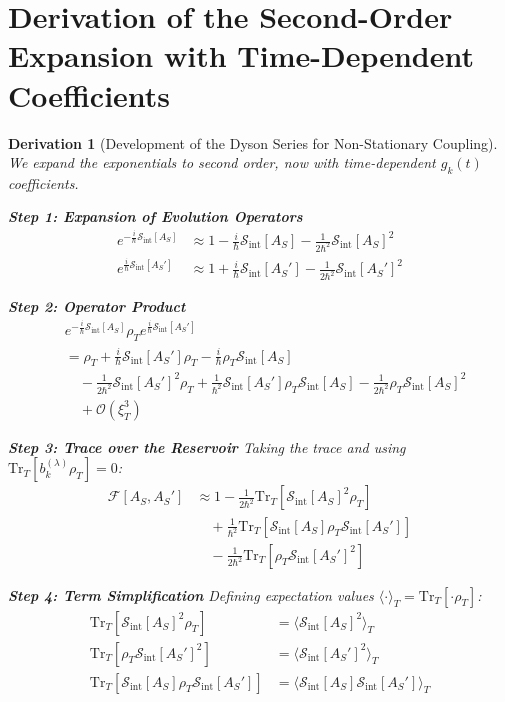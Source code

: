 \documentclass[10pt, a4paper]{article}
\newcommand{\Tr}{\text{Tr}}
\newcommand{\xiT}{\xi_T}       %
\newtheorem{derivation}{Derivation}
\begin{document}
\section{Derivation of the Second-Order Expansion with Time-Dependent Coefficients}

\begin{derivation}[Development of the Dyson Series for Non-Stationary Coupling]
We expand the exponentials to second order, now with time-dependent $g_k(t)$ coefficients.

\textbf{Step 1: Expansion of Evolution Operators}
\begin{align}
e^{-\frac{i}{\hbar} \mathcal{S}_{\text{int}}[A_S]} &\approx 1 - \frac{i}{\hbar} \mathcal{S}_{\text{int}}[A_S] - \frac{1}{2\hbar^2} \mathcal{S}_{\text{int}}[A_S]^2
\tag{12.1} \\
e^{\frac{i}{\hbar} \mathcal{S}_{\text{int}}[A_S']} &\approx 1 + \frac{i}{\hbar} \mathcal{S}_{\text{int}}[A_S'] - \frac{1}{2\hbar^2} \mathcal{S}_{\text{int}}[A_S']^2
\tag{12.2}
\end{align}

\textbf{Step 2: Operator Product}
\begin{align}
&e^{-\frac{i}{\hbar} \mathcal{S}_{\text{int}}[A_S]} \rho_T e^{\frac{i}{\hbar} \mathcal{S}_{\text{int}}[A_S']} \\
&= \rho_T + \frac{i}{\hbar} \mathcal{S}_{\text{int}}[A_S'] \rho_T - \frac{i}{\hbar} \rho_T \mathcal{S}_{\text{int}}[A_S] \\
&\quad - \frac{1}{2\hbar^2} \mathcal{S}_{\text{int}}[A_S']^2 \rho_T + \frac{1}{\hbar^2} \mathcal{S}_{\text{int}}[A_S'] \rho_T \mathcal{S}_{\text{int}}[A_S] - \frac{1}{2\hbar^2} \rho_T \mathcal{S}_{\text{int}}[A_S]^2 \\
&\quad + \mathcal{O}(\xiT^3)
\tag{12.3}
\end{align}

\textbf{Step 3: Trace over the Reservoir}
Taking the trace and using $\Tr_T[b_{k}^{(\lambda)} \rho_T] = 0$:
\begin{align}
\mathcal{F}[A_S, A_S'] &\approx 1 - \frac{1}{2\hbar^2} \Tr_T[\mathcal{S}_{\text{int}}[A_S]^2 \rho_T] \\
&\quad + \frac{1}{\hbar^2} \Tr_T[\mathcal{S}_{\text{int}}[A_S] \rho_T \mathcal{S}_{\text{int}}[A_S']] \\
&\quad - \frac{1}{2\hbar^2} \Tr_T[\rho_T \mathcal{S}_{\text{int}}[A_S']^2]
\tag{12.4}
\end{align}

\textbf{Step 4: Term Simplification}
Defining expectation values $\langle \cdot \rangle_T = \Tr_T[\cdot \rho_T]$:
\begin{align}
\Tr_T[\mathcal{S}_{\text{int}}[A_S]^2 \rho_T] &= \langle \mathcal{S}_{\text{int}}[A_S]^2 \rangle_T
\tag{12.5} \\
\Tr_T[\rho_T \mathcal{S}_{\text{int}}[A_S']^2] &= \langle \mathcal{S}_{\text{int}}[A_S']^2 \rangle_T
\tag{12.6} \\
\Tr_T[\mathcal{S}_{\text{int}}[A_S] \rho_T \mathcal{S}_{\text{int}}[A_S']] &= \langle \mathcal{S}_{\text{int}}[A_S] \mathcal{S}_{\text{int}}[A_S'] \rangle_T
\tag{12.7}
\end{align}


\end{derivation}
\end{document}
